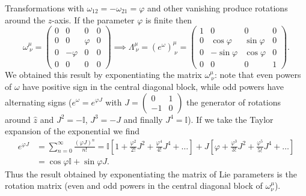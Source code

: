 \begin{example}
    Transformations with \(\omega_{12} = -\omega_{21} = \varphi\) and other vanishing produce rotations around the \(z\)-axis. If the parameter \(\varphi\) is finite then
    \[
        \omega^{\mu}_{\ \nu} = \begin{pmatrix}
            0 & 0        & 0       & 0 \\
            0 & 0        & \varphi & 0 \\
            0 & -\varphi & 0       & 0 \\
            0 & 0        & 0       & 0
        \end{pmatrix} \implies \Lambda^{\mu}_{\ \nu} = (e^{\omega})^{\mu}_{\ \nu} = \begin{pmatrix}
            1 & 0              & 0             & 0 \\
            0 & \cos{\varphi}  & \sin{\varphi} & 0 \\
            0 & -\sin{\varphi} & \cos{\varphi} & 0 \\
            0 & 0              & 0             & 1
        \end{pmatrix}.
    \]
    We obtained this result by exponentiating the matrix \(\omega^{\mu}_{\ \nu}\): note that even powers of \(\omega\) have positive sign in the central diagonal block, while odd powers have alternating signs (\(e^{\omega} = e^{\varphi J}\) with \(J = \begin{pmatrix}
        0  & 1 \\
        -1 & 0
    \end{pmatrix}\) the generator of rotations around \(\hat{z}\) and \(J^2 = -\mathbb{I}\), \(J^3 = - J \) and finally \(J^4 = \mathbb{I}\)). If we take the Taylor expansion of the exponential we find
    \[
        \begin{aligned}
            e^{\varphi J} & = \sum_{n=0}^{\infty} \frac{(\varphi J)^n}{n!} = \mathbb{I} \left[1 + \frac{\varphi^2}{2!} J^2 + \frac{\varphi^4}{4!} J^4 + \dots \right] + J \left[\varphi + \frac{\varphi^3}{3!} J^2 + \frac{\varphi^5}{5!} J^4 + \dots \right] \\
                          & = \cos{\varphi} \mathbb{I} + \sin{\varphi} J.
        \end{aligned}
    \]
    Thus the result obtained by exponentiating the matrix of Lie parameters is the rotation matrix (even and odd powers in the central diagonal block of \(\omega^{\mu}_\nu\)).


\end{example}
